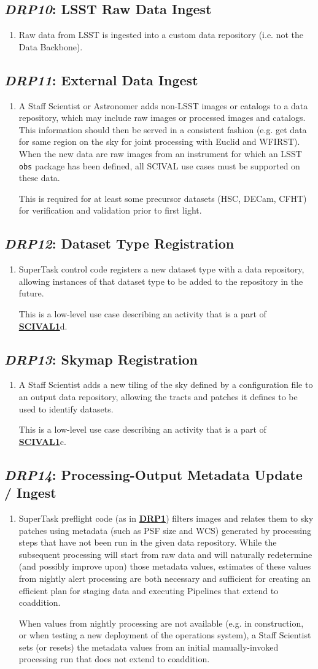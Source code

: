 \documentclass[DM,toc,lsstdraft]{lsstdoc}
\newcommand{\usecase}[3]{%
\subsection{\emph{#1}: #2}
\label{use:#1}
\begin{enumerate}[label=\alph*.]
#3
\end{enumerate}
}
\newcommand{\useref}[1]{\hyperref[use:#1]{\textcolor{lsstblue}{\textbf{#1}}}}
\begin{document}
\usecase{DRP10}{LSST Raw Data Ingest}{%

\item
Raw data from LSST is ingested into a custom data repository (i.e. not the Data Backbone).
}

\usecase{DRP11}{External Data Ingest}{%

\item
A Staff Scientist or Astronomer adds non-LSST images or catalogs to a data repository, which may include raw images or processed images and catalogs.
This information should then be served in a consistent fashion (e.g. get data for same region on the sky for joint processing with Euclid and WFIRST).
When the new data are raw images from an instrument for which an LSST \texttt{obs} package has been defined, all SCIVAL use cases must be supported on these data.

This is required for at least some precursor datasets (HSC, DECam, CFHT) for verification and validation prior to first light.
}

\usecase{DRP12}{Dataset Type Registration}{%

\item
SuperTask control code registers a new dataset type with a data repository, allowing instances of that dataset type to be added to the repository in the future.

This is a low-level use case describing an activity that is a part of \useref{SCIVAL1}d.
}

\usecase{DRP13}{Skymap Registration}{%

\item
A Staff Scientist adds a new tiling of the sky defined by a configuration file to an output data repository, allowing the tracts and patches it defines to be used to identify datasets.

This is a low-level use case describing an activity that is a part of \useref{SCIVAL1}c.
}

\usecase{DRP14}{Processing-Output Metadata Update / Ingest}{%

\item
SuperTask preflight code (as in \useref{DRP1}) filters images and relates them to sky patches using metadata (such as PSF size and WCS) generated by processing steps that have not been run in the given data repository.
While the subsequent processing will start from raw data and will naturally redetermine (and possibly improve upon) those metadata values, estimates of these values from nightly alert processing are both necessary and sufficient for creating an efficient plan for staging data and executing Pipelines that extend to coaddition.

When values from nightly processing are not available (e.g. in construction, or when testing a new deployment of the operations system), a Staff Scientist sets (or resets) the metadata values from an initial manually-invoked processing run that does not extend to coaddition.
}
\end{document}
